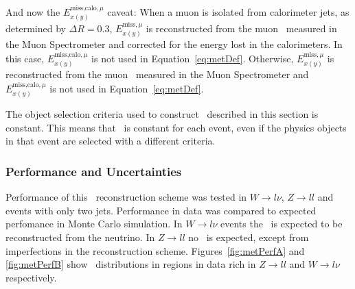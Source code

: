 \par And now the $E^{\text{miss,calo},\mu}_{x(y)}$ caveat: When a muon is isolated from calorimeter jets, 
as determined by $\Delta R=0.3$, $E^{\text{miss},\mu}_{x(y)}$ is reconstructed from the muon \pt\ 
measured in the Muon Spectrometer and corrected for the energy lost in the calorimeters. In this case, 
 $E^{\text{miss,calo},\mu}_{x(y)}$ is not used in Equation~\ref{eq:metDef}. Otherwise, 
$E^{\text{miss},\mu}_{x(y)}$ is reconstructed from the muon \pt\ measured in the Muon Spectrometer 
and $E^{\text{miss,calo},\mu}_{x(y)}$ is not used in Equation~\ref{eq:metDef}.

\par The object selection criteria used to construct \met\ described in this section is constant. This 
means that \met\ is constant for each event, even if the physics objects in that event are selected with 
a different criteria.
 
\subsubsection{Performance and Uncertainties}
\par Performance of this \met\ reconstruction scheme was tested in $W\to l\nu$, $Z\to ll$ and events 
with only two jets. Performance in data was compared to expected perfomance in Monte Carlo simulation. 
In $W\to l\nu$ events the \met\ is expected to be reconstructed from the neutrino. In $Z\to ll$ no \met\ 
is expected, except from imperfections in the reconstruction scheme. Figures~\ref{fig:metPerfA} and 
\ref{fig:metPerfB} show \met\ 
distributions in regions in data rich in $Z\to ll$ and $W\to l\nu$ respectively.

